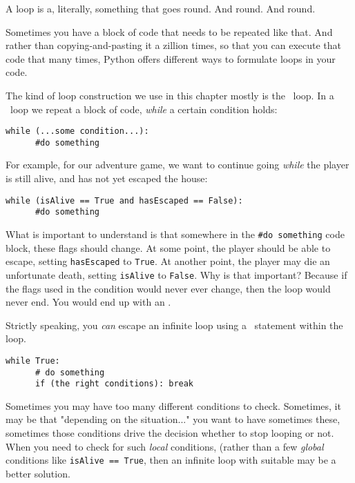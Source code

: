 A loop is a, literally, something that goes round. And round. And round. 

Sometimes you have a block of code that needs to be repeated like that. And rather than copying-and-pasting it a zillion times, so that you can execute that code that many times, Python offers different ways to formulate loops in your code. 

The kind of loop construction we use in this chapter mostly is the \whileloop\ loop. In a \whileloop\ loop we repeat a block of code, \textit{while} a certain condition holds: 

\begin{lstlisting}
while (...some condition...): 
      #do something  
\end{lstlisting}  

For example, for our adventure game, we want to continue going \textit{while} the player is still alive, and has not yet escaped the house: 

\begin{lstlisting}
while (isAlive == True and hasEscaped == False): 
      #do something  
\end{lstlisting}  

What is important to understand is that somewhere in the \texttt{\#do something} code block, these flags should change. At some point, the player should be able to escape, setting \texttt{hasEscaped} to \texttt{True}. At another point, the player may die an unfortunate death, setting \texttt{isAlive} to \texttt{False}. Why is that important? Because if the flags used in the condition would never ever change, then the loop would never end. You would end up with an \infiniteloop.

\begin{Exp}
Strictly speaking, you \emph{can} escape an infinite loop using a \breakloop\ statement within the loop.  

\begin{lstlisting}
while True: 
      # do something
      if (the right conditions): break  
\end{lstlisting}  

Sometimes you may have too many different conditions to check. Sometimes, it may be that "depending on the situation..." you want to have sometimes these, sometimes those conditions drive the decision whether to stop looping or not. When you need to check for such \emph{local} conditions, (rather than a few \emph{global} conditions like \texttt{isAlive == True}, then an infinite loop with suitable  may be a better solution. \expend 
\end{Exp}  

